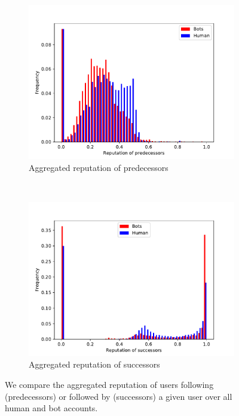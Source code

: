 \begin{figure}[t!]
    \centering
    \begin{subfigure}[t]{0.5\textwidth}
        \centering
        \includegraphics[width=\textwidth]{FIG/reputation_pre.pdf}
        \caption{Aggregated reputation of predecessors}
    \end{subfigure}%
    ~ 
    \begin{subfigure}[t]{0.5\textwidth}
        \centering
        \includegraphics[width=\textwidth]{FIG/reputation_succ.pdf}
        \caption{Aggregated reputation of successors}
    \end{subfigure}
    \caption{We compare the aggregated reputation of users following (predecessors) or followed by (successors) a given user over all human and bot accounts.}
    \label{fig:reputation}
\end{figure}

